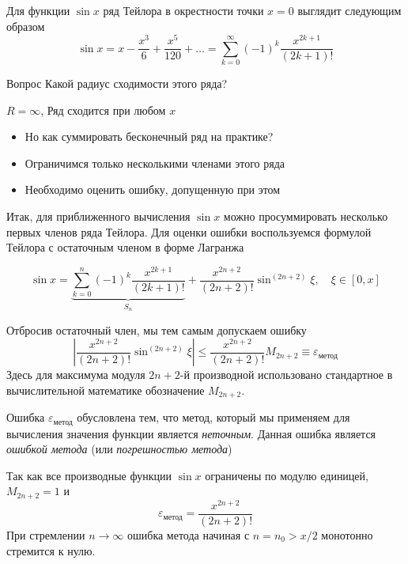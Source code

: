 \documentclass[professionalfonts,compress,unicode]{beamer}
\begin{document}
{
	Для функции $\sin x$ ряд Тейлора в окрестности точки $x=0$ выглядит следующим образом
	$$
	\sin x = x - \frac{x^3}{6} + \frac{x^5}{120} + \dots = \sum_{k=0}^{\infty} (-1)^k\frac{x^{2k+1}}{(2k+1)!}
	$$
	\pause
	\begin{block}{Вопрос}
	Какой радиус сходимости этого ряда?
	\pause
	
	$R = \infty$, Ряд сходится при любом $x$
	\end{block}
	\begin{itemize}
	\pause\item Но как суммировать бесконечный ряд на практике?
	\pause\item Ограничимся только несколькими членами этого ряда
	\pause\item Необходимо оценить ошибку, допущенную при этом
	\end{itemize}
}

{
	Итак, для приближенного вычисления $\sin x$ можно просуммировать 
	несколько первых членов ряда Тейлора. Для оценки ошибки воспользуемся 
	формулой Тейлора с остаточным членом в форме Лагранжа
	
	$$
	\sin x = \underbrace{\sum_{k=0}^{n} (-1)^k \frac{x^{2k+1}}{(2k+1)!}}_{S_n} + 
	\frac{x^{2n+2}}{(2n+2)!}\sin^{(2n+2)} \xi, 
	\quad \xi \in [0, x]
	$$
	
	\pause
	
	Отбросив остаточный член, мы тем самым допускаем ошибку 
	$$
	\left|\frac{x^{2n+2}}{(2n+2)!}\sin^{(2n+2)} \xi \right| \leq 
	\frac{x^{2n+2}}{(2n+2)!}M_{2n+2} \equiv \varepsilon_{\text{метод}} 
	$$
	Здесь для максимума модуля $2n+2$-й производной использовано стандартное в 
	вычислительной математике обозначение $M_{2n+2}$.
}

{
	Ошибка $\varepsilon_{\text{метод}}$ обусловлена тем, что метод, который мы 
	применяем для вычисления значения функции является \emph{неточным}.
	Данная ошибка является \emph{ошибкой метода} (или \emph{погрешностью метода})
	
	\pause
	
	Так как все производные функции $\sin x$ ограничены по модулю единицей, $M_{2n+2} = 1$ и 
	$$
	\varepsilon_{\text{метод}} = \frac{x^{2n+2}}{(2n+2)!}
	$$
	При стремлении $n \rightarrow \infty$ ошибка метода начиная с $n = n_0 >
	x/2$ монотонно стремится к нулю.
}
\end{document}
